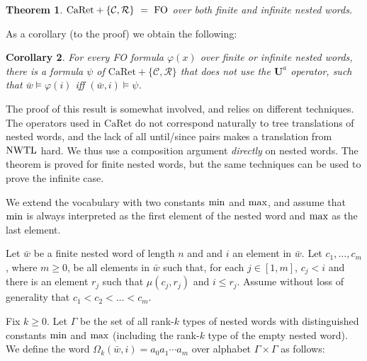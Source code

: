 \documentclass{LMCS}
\newcommand{\M}{{\mu}}
\newcommand{\w}{{\bar{w}}}
\newcommand{\C}{{\mathcal{C}}}
\newcommand{\R}{{\mathcal{R}}}
\newcommand{\U}{{\mathbf U}}
\newcommand{\FO}{{\rm FO}}
\renewcommand{\phi}{\varphi}
\theoremstyle{plain}
\newtheorem{theorem}{Theorem}[section]
\newtheorem{corollary}[theorem]{Corollary}
\theoremstyle{definition}
\newcommand{\Ur}{\U^a}
\newcommand{\caret}{\text{CaRet}}
\begin{document}
\begin{theorem}
\label{expcompl-one}
$\caret+\{\C,\R\} \ =\ \FO$ over both finite and infinite nested words.
\end{theorem}

As a corollary (to the proof) we obtain the following: 

\begin{corollary}
For every FO formula $\phi(x)$ over finite or infinite nested words, there is a
formula $\psi$ of $\caret+\{\C,\R\}$ that does not use the $\Ur$
operator, such that $\w \models \phi(i)$ iff $(\w,i) \models \psi$.  
\end{corollary}

The proof of this result is somewhat involved, and
relies on different techniques. The operators used in $\caret$ do not
correspond naturally to tree translations of nested words, and the
lack of all until/since pairs makes a translation from $\text{\rm NWTL}$
hard. We thus use a composition argument {\em directly} on nested
words. The theorem is proved for finite nested words, but 
the same techniques can be used to prove the infinite case. 

\renewcommand{\min}{{\rm min}}
\newcommand{\maxx}{{\rm max}}

We extend the vocabulary with two constants $\min$ and $\maxx$, and
assume that $\min$ is always interpreted as the first element of the
nested word and $\maxx$ as the last element. 

Let $\w$ be a finite nested word of length $n$ and   
and $i$ an element in $\w$. Let
 $c_1,\dots,c_m$, where $m \geq 0$, be all elements in $\w$ such that,
 for each $j \in [1,m]$, $c_j < i$ and there is an
 element $r_j$ such
  that $\M(c_j,r_j)$ and $i \leq r_j$. Assume without loss of
 generality that $c_1 < c_2 < \dots < c_m$.  

Fix $k \geq 0$.  Let $\Gamma$ be the set of all rank-$k$ types of
nested words with distinguished constants $\min$ and $\maxx$
(including the rank-$k$ type of the empty nested word). We define the
word $\Omega_k(\w,i) = a_0 a_1 \cdots a_m$ over alphabet $\Gamma
\times \Gamma$ as follows:
\end{document}
